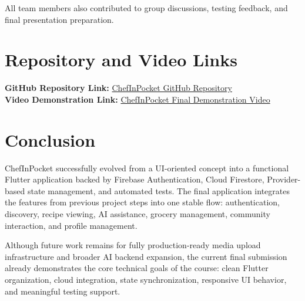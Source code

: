 \documentclass[11pt,a4paper]{article}
\begin{document}
All team members also contributed to group discussions, testing feedback, and final presentation preparation.

\section{Repository and Video Links}

\textbf{GitHub Repository Link:} \href{https://github.com/mesely/ChefInPocket.git}{ChefInPocket GitHub Repository}\\
\textbf{Video Demonstration Link:} \href{https://drive.google.com/file/d/1mq7al5-YKul97OcmdqHyZZJg-OTXAfuq/view?usp=sharing}{ChefInPocket Final Demonstration Video}

\section{Conclusion}

ChefInPocket successfully evolved from a UI-oriented concept into a functional Flutter application backed by Firebase Authentication, Cloud Firestore, Provider-based state management, and automated tests. The final application integrates the features from previous project steps into one stable flow: authentication, discovery, recipe viewing, AI assistance, grocery management, community interaction, and profile management.

Although future work remains for fully production-ready media upload infrastructure and broader AI backend expansion, the current final submission already demonstrates the core technical goals of the course: clean Flutter organization, cloud integration, state synchronization, responsive UI behavior, and meaningful testing support.
\end{document}
